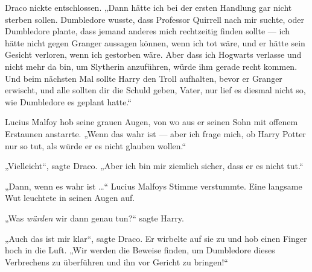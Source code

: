 Draco nickte entschlossen.
„Dann hätte ich bei der ersten Handlung gar nicht sterben sollen. Dumbledore wusste, dass Professor Quirrell nach mir suchte, oder Dumbledore plante, dass jemand anderes mich rechtzeitig finden sollte — ich hätte nicht gegen Granger aussagen können, wenn ich tot wäre, und er hätte sein Gesicht verloren, wenn ich gestorben wäre. Aber dass ich Hogwarts verlasse und nicht mehr da bin, um Slytherin anzuführen, würde ihm gerade recht kommen. Und beim nächsten Mal sollte Harry den Troll aufhalten, bevor er Granger erwischt, und alle sollten dir die Schuld geben, Vater, nur lief es diesmal nicht so, wie Dumbledore es geplant hatte.“

Lucius Malfoy hob seine grauen Augen, von wo aus er seinen Sohn mit offenem Erstaunen anstarrte.
„Wenn das wahr ist — aber ich frage mich, ob Harry Potter nur so tut, als würde er es nicht glauben wollen.“

„Vielleicht“, sagte Draco.
„Aber ich bin mir ziemlich sicher, dass er es nicht tut.“

„Dann, wenn es wahr ist …“
Lucius Malfoys Stimme verstummte. Eine langsame Wut leuchtete in seinen Augen auf.

„Was \emph{würden} wir dann genau tun?“ sagte Harry.

„Auch das ist mir klar“, sagte Draco. Er wirbelte auf sie zu und hob einen Finger hoch in die Luft.
„Wir werden die Beweise finden, um Dumbledore dieses Verbrechens zu überführen und ihn vor Gericht zu bringen!“

